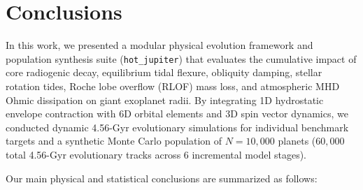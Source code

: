 \section{Conclusions}

In this work, we presented a modular physical evolution framework and population synthesis suite (\texttt{hot\_jupiter}) that evaluates the cumulative impact of core radiogenic decay, equilibrium tidal flexure, obliquity damping, stellar rotation tides, Roche lobe overflow (RLOF) mass loss, and atmospheric MHD Ohmic dissipation on giant exoplanet radii. By integrating 1D hydrostatic envelope contraction with 6D orbital elements and 3D spin vector dynamics, we conducted dynamic 4.56-Gyr evolutionary simulations for individual benchmark targets and a synthetic Monte Carlo population of $N = 10,000$ planets ($60,000$ total 4.56-Gyr evolutionary tracks across 6 incremental model stages).

Our main physical and statistical conclusions are summarized as follows:

